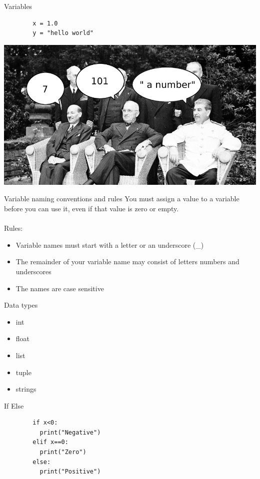 \documentclass{beamer}
\begin{document}
\begin{frame}[fragile]{Variables}
	\begin{verbatim}
		x = 1.0
		y = "hello world"
	\end{verbatim}
	\begin{center}
		\includegraphics[width=.7\textwidth]{./img/variables.jpg}
	\end{center}
\end{frame}

\begin{frame}{Variable naming conventions and rules}
	You must assign a value to a variable before you can use it, 
	even if that value is zero or empty.
	\\
	\\
	{\Large Rules:}
	\begin{itemize}
		\item Variable names must start with a letter or an underscore (\_)
		\item The remainder of your variable name may consist of letters
			numbers and underscores
		\item The names are case sensitive
	\end{itemize}
\end{frame}

\begin{frame}{Data types}
	\begin{itemize}
		\item int
		\item float
		\item list
		\item tuple
		\item strings
	\end{itemize}
\end{frame}

\begin{frame}[fragile]{If Else}
	\begin{verbatim}
		if x<0:
	 	  print("Negative")
		elif x==0:
		  print("Zero")
		else:
		  print("Positive")
	\end{verbatim}
\end{frame}
\end{document}

